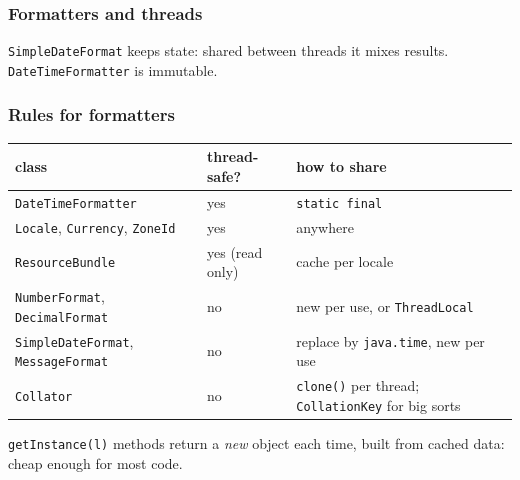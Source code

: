 \documentclass[aspectratio=169,10pt,compress]{beamer}
\begin{document}




\begin{frame}[t,fragile] \frametitle{Formatters and threads}

  \vspace{0.1em}
  \small
  \texttt{SimpleDateFormat} keeps state: shared between threads it mixes results. \texttt{DateTimeFormatter} is immutable.
\end{frame}




\begin{frame}[t,fragile] \frametitle{Rules for formatters}
  \begin{center}\small
  \begin{tabular}{lll}
    \toprule
    \textbf{class} & \textbf{thread-safe?} & \textbf{how to share} \\
    \midrule
    \texttt{DateTimeFormatter}           & yes  & \texttt{static final} \\
    \texttt{Locale}, \texttt{Currency}, \texttt{ZoneId} & yes & anywhere \\
    \texttt{ResourceBundle}               & yes (read only) & cache per locale \\
    \texttt{NumberFormat}, \texttt{DecimalFormat} & no & new per use, or \texttt{ThreadLocal} \\
    \texttt{SimpleDateFormat}, \texttt{MessageFormat} & no & replace by \texttt{java.time}, new per use \\
    \texttt{Collator}                     & no  & \texttt{clone()} per thread; \texttt{CollationKey} for big sorts \\
    \bottomrule
  \end{tabular}
  \end{center}
  \small \texttt{getInstance(l)} methods return a \emph{new} object each time, built from cached data: cheap enough for most code.
\end{frame}

\end{document}
